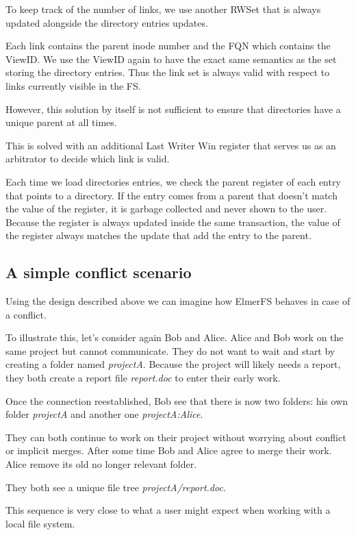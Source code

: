 \documentclass[sigconf,anonymous,10pt]{acmart}
\begin{document}
To keep track of the number of links, we use another RWSet that is
always updated alongside the directory entries updates.

Each link contains the parent inode number and the FQN which contains
the ViewID.
We use the ViewID again to have the exact same semantics as the set storing
the directory entries. Thus the link set is always valid with respect to
links currently visible in the FS.

However, this solution by itself is not sufficient to ensure that directories have a
unique parent at all times.

This is solved with an additional Last Writer Win register that serves us as
an arbitrator to decide which link is valid.

Each time we load directories  entries, we check the parent register of each
entry that points to a directory. If the entry comes from a parent that doesn’t
match the value of the register, it is garbage collected and never shown to the user.
Because the register is always updated inside the same transaction, the
value of the register always matches the update that add the entry
to the parent.

\subsection{A simple conflict scenario}

Using the design described above we can imagine how ElmerFS behaves in case
of a conflict.

To illustrate this, let's consider again Bob and Alice. Alice and Bob work
on the same project but cannot communicate. They do not want to wait and start by creating a
folder named \textit{projectA}. Because the project will likely needs a report,
they both create a report file \textit{report.doc} to enter their early work.

Once the connection reestablished, Bob see that there is now two folders:
his own folder \textit{projectA} and another one \textit{projectA:Alice}.

They can both continue to work on their project without worrying about
conflict or implicit merges. After some time Bob and Alice agree to merge
their work. Alice remove its old no longer relevant folder.

They both see a unique file tree \textit{projectA/report.doc}.

This sequence is very close to what a user might expect when working with
a local file system.
\end{document}
